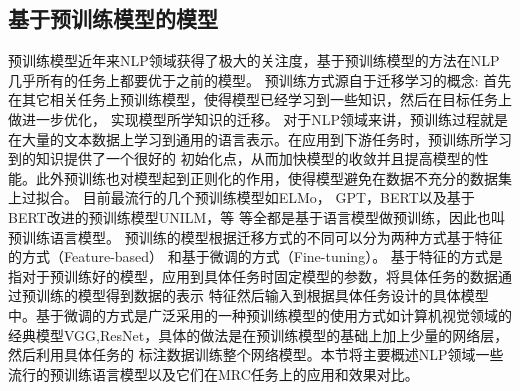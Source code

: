 \subsection{基于预训练模型的模型}
预训练模型近年来NLP领域获得了极大的关注度，基于预训练模型的方法在NLP几乎所有的任务上都要优于之前的模型。
预训练方式源自于迁移学习的概念: 首先在其它相关任务上预训练模型，使得模型已经学习到一些知识，然后在目标任务上做进一步优化，
实现模型所学知识的迁移。
对于NLP领域来讲，预训练过程就是在大量的文本数据上学习到通用的语言表示。在应用到下游任务时，预训练所学习到的知识提供了一个很好的
初始化点，从而加快模型的收敛并且提高模型的性能。此外预训练也对模型起到正则化的作用，使得模型避免在数据不充分的数据集上过拟合。
目前最流行的几个预训练模型如ELMo\cite{ELMo}，
GPT\cite{GPT}，BERT\cite{BERT}以及基于BERT改进的预训练模型UNILM，等
等全都是基于语言模型做预训练，因此也叫预训练语言模型。
预训练的模型根据迁移方式的不同可以分为两种方式基于特征的方式（Feature-based）
和基于微调的方式（Fine-tuning）。
基于特征的方式是指对于预训练好的模型，应用到具体任务时固定模型的参数，将具体任务的数据通过预训练的模型得到数据的表示
特征然后输入到根据具体任务设计的具体模型中。基于微调的方式是广泛采用的一种预训练模型的使用方式如计算机视觉领域的
经典模型VGG,ResNet，具体的做法是在预训练模型的基础上加上少量的网络层，然后利用具体任务的
标注数据训练整个网络模型。本节将主要概述NLP领域一些流行的预训练语言模型以及它们在MRC任务上的应用和效果对比。

